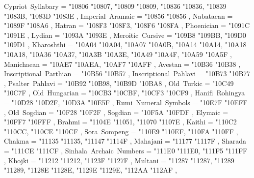{    Cypriot~Syllabary                              = { {"10806} {"10807}, {"10809} {"10809}, {"10836} {"10836}, {"10839} {"1083B}, {"1083D} {"1083E} },
    Imperial~Aramaic                               = { {"10856} {"10856} },
    Nabataean                                      = { {"1089F} {"108A6} },
    Hatran                                         = { {"108F3} {"108F3}, {"108F6} {"108FA} },
    Phoenician                                     = { {"1091C} {"1091E} },
    Lydian                                         = { {"1093A} {"1093E} },
    Meroitic~Cursive                               = { {"109B8} {"109BB}, {"109D0} {"109D1} },
    Kharoshthi                                     = { {"10A04} {"10A04}, {"10A07} {"10A0B}, {"10A14} {"10A14}, {"10A18} {"10A18}, {"10A36} {"10A37}, {"10A3B} {"10A3E}, {"10A49} {"10A4F}, {"10A59} {"10A5F} },
    Manichaean                                     = { {"10AE7} {"10AEA}, {"10AF7} {"10AFF} },
    Avestan                                        = { {"10B36} {"10B38} },
    Inscriptional~Parthian                         = { {"10B56} {"10B57} },
    Inscriptional~Pahlavi                          = { {"10B73} {"10B77} },
    Psalter~Pahlavi                                = { {"10B92} {"10B98}, {"10B9D} {"10BA8} },
    Old~Turkic                                     = { {"10C49} {"10C7F} },
    Old~Hungarian                                  = { {"10CB3} {"10CBF}, {"10CF3} {"10CF9} },
    Hanifi~Rohingya                                = { {"10D28} {"10D2F}, {"10D3A} {"10E5F} },
    Rumi~Numeral~Symbols                           = { {"10E7F} {"10EFF} },
    Old~Sogdian                                    = { {"10F28} {"10F2F} },
    Sogdian                                        = { {"10F5A} {"10FDF} },
    Elymaic                                        = { {"10FF7} {"10FFF} },
    Brahmi                                         = { {"1104E} {"11051}, {"11070} {"1107E} },
    Kaithi                                         = { {"110C2} {"110CC}, {"110CE} {"110CF} },
    Sora~Sompeng                                   = { {"110E9} {"110EF}, {"110FA} {"110FF} },
    Chakma                                         = { {"11135} {"11135}, {"11147} {"1114F} },
    Mahajani                                       = { {"11177} {"1117F} },
    Sharada                                        = { {"111CE} {"111CF} },
    Sinhala~Archaic~Numbers                        = { {"111E0} {"111E0}, {"111F5} {"111FF} },
    Khojki                                         = { {"11212} {"11212}, {"1123F} {"1127F} },
    Multani                                        = { {"11287} {"11287}, {"11289} {"11289}, {"1128E} {"1128E}, {"1129E} {"1129E}, {"112AA} {"112AF} },
}
